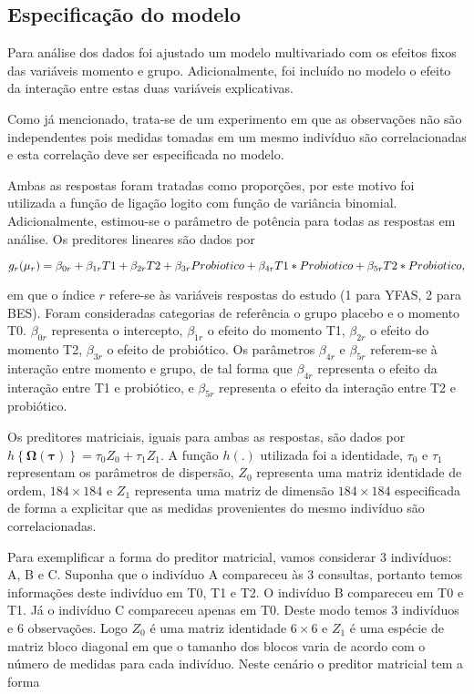 
\subsection{Especificação do modelo}

Para análise dos dados foi ajustado um modelo multivariado com os efeitos fixos das variáveis momento e grupo. Adicionalmente, foi incluído no modelo o efeito da interação entre estas duas variáveis explicativas.

Como já mencionado, trata-se de um experimento em que as observações não são independentes pois medidas tomadas em um mesmo indivíduo são correlacionadas e esta correlação deve ser especificada no modelo. 

Ambas as respostas foram tratadas como proporções, por este motivo foi utilizada a função de ligação logito com função de variância binomial. Adicionalmente, estimou-se o parâmetro de potência para todas as respostas em análise. Os preditores lineares são dados por

$$
g_{r}(\mu_{r}) = \beta_{0r} + \beta_{1r} T1 + \beta_{2r} T2 + \beta_{3r} Probiotico + \\ \beta_{4r} T1*Probiotico + \beta_{5r} T2*Probiotico,
$$

\noindent em que o índice $r$ refere-se às variáveis respostas do estudo (1 para YFAS, 2 para BES). Foram consideradas categorias de referência o grupo placebo e o momento T0. $\beta_{0r}$ representa o intercepto, $\beta_{1r}$ o efeito do momento T1, $\beta_{2r}$ o efeito do momento T2, $\beta_{3r}$ o efeito de probiótico. Os parâmetros $\beta_{4r}$ e $\beta_{5r}$ referem-se à interação entre momento e grupo, de tal forma que $\beta_{4r}$ representa o efeito da interação entre T1 e probiótico, e $\beta_{5r}$ representa o efeito da interação entre T2 e probiótico.

Os preditores matriciais, iguais para ambas as respostas, são dados por $h\left \{ \boldsymbol{\Omega}(\boldsymbol{\tau}) \right \} = \tau_0Z_0 + \tau_1Z_1$. A função $h(.)$ utilizada foi a identidade, $\tau_0$ e $\tau_1$ representam os parâmetros de dispersão, $Z_0$ representa uma matriz identidade de ordem, $184 \times 184$ e $Z_1$ representa uma matriz de dimensão $184 \times 184$ especificada de forma a explicitar que as medidas provenientes do mesmo indivíduo são correlacionadas. 

Para exemplificar a forma do preditor matricial, vamos considerar 3 indivíduos: A, B e C. Suponha que o indivíduo A compareceu às 3 consultas, portanto temos informações deste indivíduo em T0, T1 e T2. O indivíduo B compareceu em T0 e T1. Já o indivíduo C compareceu apenas em T0. Deste modo temos 3 indivíduos e 6 observações. Logo $Z_0$ é uma matriz identidade $6 \times 6$ e $Z_1$ é uma espécie de matriz bloco diagonal em que o tamanho dos blocos varia de acordo com o número de medidas para cada indivíduo. Neste cenário o preditor matricial tem a forma

